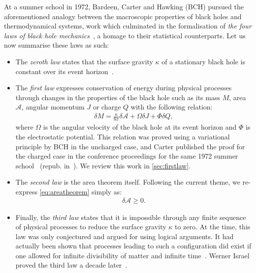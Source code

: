 \documentclass[
twoside,
openright,
frontopenright,
]{dmathesis}
\begin{document}
At a summer school in 1972, Bardeen, Carter and Hawking (BCH) pursued the
aforementioned analogy between the macroscopic properties of black holes and
thermodynamical systems, work which culminated in the formalisation of \emph{the
  four laws of black hole mechanics}~\cite{Bardeen:1973gs}, a homage to their
statistical counterparts. Let us now summarise these laws as such:
\begin{itemize}
\item The \emph{zeroth law} states that the surface gravity $\kappa$ of a
  stationary black hole is constant over its event
  horizon~\cite{Bardeen:1973gs,Hawking:1973qla,Carter:1973rla,Carter2009,
    Carter2010}.
\item The \emph{first law} expresses conservation of energy during physical
  processes through changes in the properties of the black hole such as its mass
  $M$, area $\mathcal{A}$, angular momentum $J$ or charge $Q$ with the following
  relation:
  \begin{align}
    \label{eq:firstlawBHM}
    \delta M = \frac{\kappa}{8\pi} \delta \mathcal{A} + \Omega \delta J + \Phi
    \delta Q, 
  \end{align}
  where $\Omega$ is the angular velocity of the black hole at its event horizon
  and $\Phi$ is the electrostatic potential. This relation was proved using a
  variational principle by BCH in the uncharged case, and Carter published the
  proof for the charged case in the conference proceedings for the same 1972
  summer school~\cite{Carter:1973rla} (repub. in~\cite{Carter2010}). We review
  this work in \cref{sec:firstlaw}.
\item The \emph{second law} is the area theorem itself. Following the current
  theme, we re-express \cref{eq:areatheorem} simply as:
  \begin{align}
    \label{eq:secondlaw}
    \delta\mathcal{A}\geqslant 0.
  \end{align}
\item Finally, the \emph{third law} states that it is impossible through any
  finite sequence of physical processes to reduce the surface gravity $\kappa$
  to zero. At the time, this law was only conjectured and argued for using
  logical arguments. It had actually been shown that processes leading to such a
  configuration did exist if one allowed for infinite divisibility of matter and
  infinite time~\cite{Christodoulou:1970wf,Bardeen:1970zz}. Werner Israel proved
  the third law a decade later~\cite{Israel:1986gqz}.
\end{itemize} 
\end{document}
